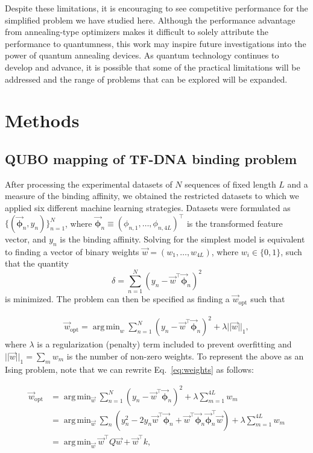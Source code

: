 \documentclass[aps,pra,groupedaddress,nofootinbib,notitlepage,showpacs,floatfix,superscriptaddress]{revtex4-1}
\DeclareMathOperator*{\argmin}{arg\,min}
\begin{document}
Despite these limitations, it is encouraging to see competitive performance for the simplified problem we have studied here. Although the performance advantage from annealing-type optimizers makes it difficult to solely attribute the performance to quantumness, this work may inspire future investigations into the power of quantum annealing devices. As quantum technology continues to develop and advance, it is possible that some of the practical limitations will be addressed and the range of problems that can be explored will be expanded.  

\section*{Methods}

\subsection*{QUBO mapping of TF-DNA binding problem}
After processing the experimental datasets of $N$ sequences of fixed length $L$ and a measure of the binding affinity, we obtained the restricted datasets to which we applied six different machine learning strategies. Datasets were formulated as $\{(\vec{\bm\phi}_n,y_n)\}_{n=1}^N$, where  $\vec{\bm{\phi}}_n \equiv (\phi_{n,1},\dotsc, \phi_{n,4L})^{\intercal}$ is the transformed feature vector, and $y_n$ is the binding affinity. Solving for the simplest model is equivalent to finding a vector of binary weights $\vec{w} = (w_1,\dotsc,w_{4L})$, where $w_i \in \{0,1\}$, such that the quantity
\begin{equation}
\delta = \sum_{n=1}^N \left(y_n - \vec{w}^\intercal\vec{\bm{\phi}}_n\right)^2\label{eq:delta} 
\end{equation}
 is minimized. The problem can then be specified as finding a $\vec{w}_{\text{opt}}$ such that

\begin{align}
\vec{w}_{\text{opt}} = \argmin_w\sum_{n=1}^N \left(y_n - \vec{w}^\intercal\vec{\bm{\phi}}_n\right)^2 + \lambda||\vec{w}||_1 \label{eq:weights},
\end{align}
%
where $\lambda$ is a regularization (penalty) term included to prevent overfitting and $||\vec{w}||_1 = \sum_m w_m$ is the number of non-zero weights. To represent the above as an Ising problem, note that we can rewrite Eq.~\eqref{eq:weights} as follows:

\begin{align}\label{eq:isingform}
\vec{w}_{\text{opt}} &= \argmin_{\vec{w}} \sum_{n=1}^N \left(y_n - \vec{w}^\intercal\vec{\bm{\phi}}_n\right)^2 + \lambda\sum_{m=1}^{4L}w_m\\ \nonumber
& = \argmin_{\vec{w}} \sum_n \left(y_n^2 -2y_n\vec{w}^\intercal\vec{\bm{\phi}}_n + \vec{w}^\intercal\vec{\bm{\phi}}_n\vec{\bm{\phi}}_n^\intercal\vec{w}\right) + \lambda\sum_{m=1}^{4L}w_m\\ \nonumber
&= \argmin_{\vec{w}}\vec{w}^\intercal Q \vec{w} + \vec{w}^\intercal k,
\end{align}
\end{document}
